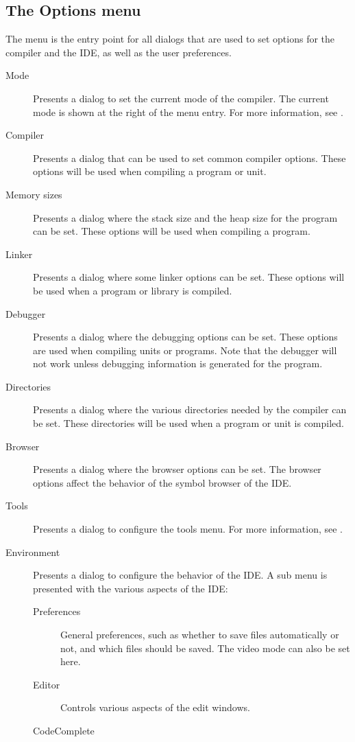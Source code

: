\subsection{The Options menu}
\label{se:menuoptions}
The  menu is the entry point for all dialogs that are used to set
options for the compiler and the IDE, as well as the user preferences.
\begin{description}
\item[Mode] Presents a dialog to set the current mode of the compiler. The
current mode is shown at the right of the menu entry. For more information,
see .
\item[Compiler] Presents a dialog that can be used to set common compiler
options. These options will be used when compiling a program or unit.
\item[Memory sizes]
Presents a dialog where the stack size and the heap size for the program can
be set. These options will be used when compiling a program.
\item[Linker]
Presents a dialog where some linker options can be set. These options will
be used when a program or library is compiled.
\item[Debugger]
Presents a dialog where the debugging options can be set. These options
are used when compiling units or programs. Note that the debugger will not
work unless debugging information is generated for the program.
\item[Directories]
Presents a dialog where the various directories needed by the compiler can
be set. These directories will be used when a program or unit is compiled.
\item[Browser]
Presents a dialog where the browser options can be set. The browser options
affect the behavior of the symbol browser of the IDE.
\item[Tools]
Presents a dialog to configure the tools menu. For more information, see
.
\item[Environment]
Presents a dialog to configure the behavior of the IDE. A sub menu is
presented with the various aspects of the IDE:
\begin{description}
\item[Preferences]
General preferences, such as whether to save files automatically or not, 
and which files should be saved. The video mode can also be set here.
\item[Editor]
Controls various aspects of the edit windows.
\item[CodeComplete]

\end{description}
\end{description}
